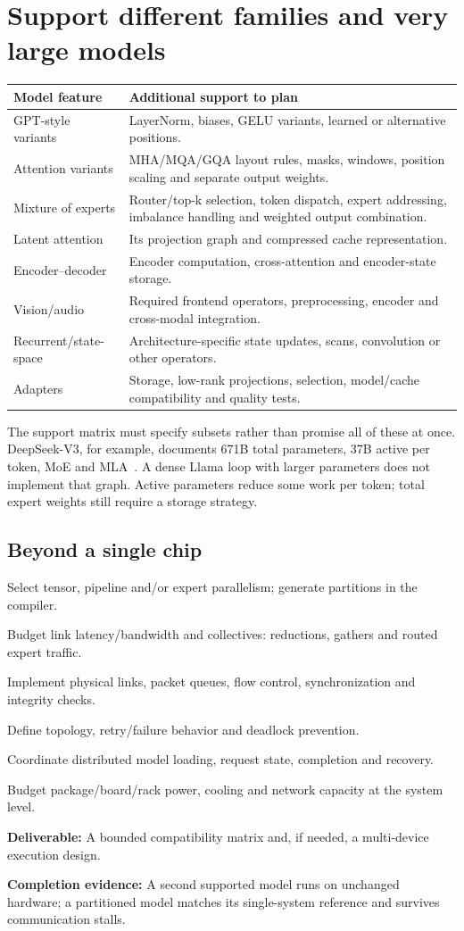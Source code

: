 \documentclass[11pt,a4paper]{article}
\newcommand{\phase}[2]{\clearpage\section{#1}\label{#2}}
\newcommand{\deliver}[2]{\begin{tcolorbox}[colback=pale,colframe=line,boxrule=0.5pt,arc=1mm,left=8pt,right=8pt,top=6pt,bottom=6pt]\textbf{Deliverable:} #1\par\textbf{Completion evidence:} #2\end{tcolorbox}}
\begin{document}
\phase{Support different families and very large models}{sec:portability}
\begin{tabularx}{\linewidth}{@{}p{36mm}Y@{}}
\toprule\textbf{Model feature} & \textbf{Additional support to plan}\\\midrule
GPT-style variants & LayerNorm, biases, GELU variants, learned or alternative positions.\\
Attention variants & MHA/MQA/GQA layout rules, masks, windows, position scaling and separate output weights.\\
Mixture of experts & Router/top-k selection, token dispatch, expert addressing, imbalance handling and weighted output combination.\\
Latent attention & Its projection graph and compressed cache representation.\\
Encoder--decoder & Encoder computation, cross-attention and encoder-state storage.\\
Vision/audio & Required frontend operators, preprocessing, encoder and cross-modal integration.\\
Recurrent/state-space & Architecture-specific state updates, scans, convolution or other operators.\\
Adapters & Storage, low-rank projections, selection, model/cache compatibility and quality tests.\\\bottomrule
\end{tabularx}
The support matrix must specify subsets rather than promise all of these at once.
DeepSeek-V3, for example, documents 671B total parameters, 37B active per token,
MoE and MLA~\cite{deepseek}. A dense Llama loop with larger parameters does not
implement that graph. Active parameters reduce some work per token; total expert
weights still require a storage strategy.

\subsection*{Beyond a single chip}
\begin{checklist}
\item Select tensor, pipeline and/or expert parallelism; generate partitions in the compiler.
\item Budget link latency/bandwidth and collectives: reductions, gathers and routed expert traffic.
\item Implement physical links, packet queues, flow control, synchronization and integrity checks.
\item Define topology, retry/failure behavior and deadlock prevention.
\item Coordinate distributed model loading, request state, completion and recovery.
\item Budget package/board/rack power, cooling and network capacity at the system level.
\end{checklist}
\deliver{A bounded compatibility matrix and, if needed, a multi-device execution
design.}{A second supported model runs on unchanged hardware; a partitioned
model matches its single-system reference and survives communication stalls.}
\end{document}

